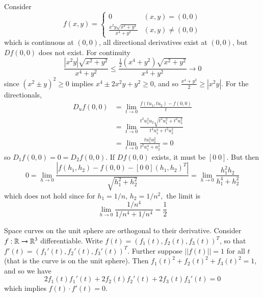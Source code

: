 \begin{example}
    Consider \begin{equation*}
        f(x,y) = \left\{\begin{array}{cc} 0 & (x,y) = (0,0) \\ \frac{x^2y\sqrt{x^2+y^2}}{x^4+y^2} & (x,y) \neq (0,0)  \end{array}\right.
    \end{equation*}
    which is continuous at $(0,0)$, all directional derivatives exist at $(0,0)$, but $Df(0,0)$ does not exist. For continuity $$\frac{|x^2y|\sqrt{x^2+y^2}}{x^4+y^2} \leq \frac{\frac{1}{2}(x^4+y^2)\sqrt{x^2+y^2}}{x^4+y^2}\rightarrow 0$$ since $(x^2\pm y)^2 \geq 0$ implies $x^4 \pm 2x^2y + y^2 \geq 0$, and so $\frac{x^4+y^2}{2} \geq |x^2y|$. For the directionals, \begin{align*}
        D_uf(0,0) &= \lim\limits_{t\rightarrow 0}\frac{f(tu_1,tu_2) - f(0,0)}{t} \\
        &= \lim\limits_{t\rightarrow 0}\frac{t^2u_1^2u_2\sqrt{t^2u_1^2+t^2u_2^2}}{t^4u_1^4+t^2u_2^2} \\
        &= \lim\limits_{t\rightarrow 0}\frac{tu_1^2u_2^2}{t^2u_1^4+u_2^2} = 0
    \end{align*}
    so $D_1f(0,0) = 0 = D_2f(0,0)$. If $Df(0,0)$ exists, it must be $[0\;0]$. But then $$0 = \lim\limits_{h\rightarrow 0}\frac{|f(h_1,h_2) - f(0,0) - [0\;0](h_1,h_2)^T|}{\sqrt{h_1^2+h_2^2}} = \lim\limits_{h\rightarrow 0}\frac{h_1^2h_2}{h_1^4+h_2^2}$$ which does not hold since for $h_1 = 1/n$, $h_2 = 1/n^2,$ the limit is $$\lim\limits_{h\rightarrow 0}\frac{1/n^4}{1/n^4+1/n^4} = \frac{1}{2}$$
\end{example}

\begin{example}
    Space curves on the unit sphere are orthogonal to their derivative. Consider $f:\mathbb R\rightarrow \mathbb R^3$ differentiable. Write $f(t) = (f_1(t),f_2(t),f_3(t))^T$, so that $f'(t) = (f_1'(t),f_2'(t),f_3'(t))^T$. Further suppose $||f(t)|| = 1$ for all $t$ (that is the curve is on the unit sphere). Then $f_1(t)^2+f_2(t)^2+f_3(t)^2 = 1$, and so we have $$2f_1(t)f_1'(t) +2f_2(t)f_2'(t)+2f_3(t)f_3'(t) = 0$$ which implies $f(t)\cdot f'(t) = 0$.
\end{example}

